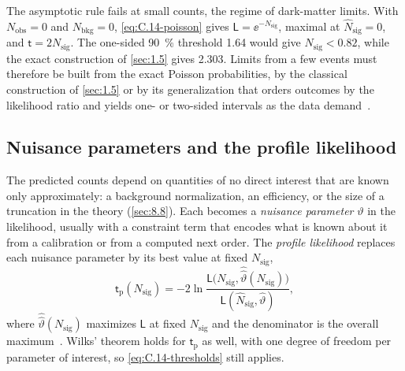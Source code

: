 The asymptotic rule fails at small counts, the regime of dark-matter limits. With $N_{\mathrm{obs}} = 0$ and $N_{\mathrm{bkg}} = 0$, \cref{eq:C.14-poisson} gives $\mathsf{L} = \ee^{-N_{\mathrm{sig}}}$, maximal at $\hat N_{\mathrm{sig}} = 0$, and $\mathsf{t} = 2N_{\mathrm{sig}}$. The one-sided \SI{90}{\percent} threshold 1.64 would give $N_{\mathrm{sig}} < 0.82$, while the exact construction of \cref{sec:1.5} gives 2.303. Limits from a few events must therefore be built from the exact Poisson probabilities, by the classical construction of \cref{sec:1.5} or by its generalization that orders outcomes by the likelihood ratio and yields one- or two-sided intervals as the data demand~\cite{feldman1998unified}.

\subsection{Nuisance parameters and the profile likelihood}

The predicted counts depend on quantities of no direct interest that are known only approximately: a background normalization, an efficiency, or the size of a truncation in the theory (\cref{sec:8.8}). Each becomes a \emph{nuisance parameter} $\vartheta$ in the likelihood, usually with a constraint term that encodes what is known about it from a calibration or from a computed next order. The \emph{profile likelihood} replaces each nuisance parameter by its best value at fixed $N_{\mathrm{sig}}$,
\begin{equation}
  \mathsf{t}_{\mathrm{p}}(N_{\mathrm{sig}}) = -2\ln\frac{\mathsf{L}\bigl(N_{\mathrm{sig}}, \hat{\hat\vartheta}(N_{\mathrm{sig}})\bigr)}{\mathsf{L}(\hat N_{\mathrm{sig}}, \hat\vartheta)} ,
  \label{eq:C.14-profile}
\end{equation}
where $\hat{\hat\vartheta}(N_{\mathrm{sig}})$ maximizes $\mathsf{L}$ at fixed $N_{\mathrm{sig}}$ and the denominator is the overall maximum~\cite[Eq.~(7)]{cowan2011asymptotic}. Wilks' theorem holds for $\mathsf{t}_{\mathrm{p}}$ as well, with one degree of freedom per parameter of interest, so \cref{eq:C.14-thresholds} still applies.

